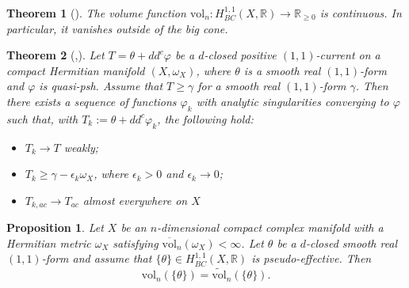 \documentclass[10pt,a4paper]{amsart}
\newtheorem{prop}{Proposition}
\newtheorem{theo}{Theorem}
\newcommand{\RR}{\mathbb{R}}
\begin{document}
\begin{theo}[{\cite[Theorem 3.20]{BGL}}]\label{vanishing-vol}
The volume function $\mathrm{vol}_n:\allowbreak H^{1,1}_{BC}(X,\mathbb{R}) \to \mathbb{R}_{\ge0}$ is continuous. In
particular, it vanishes outside of the big cone.
\end{theo}

\begin{theo}[{\cite[Proposition 3.7]{Dem92},\cite[Theorem 2.4]{Bou}}]\label{regularization}
Let $T=\theta+dd^c\varphi$ be a $d$-closed positive $(1,1)$-current on a compact Hermitian manifold $(X,\omega_X)$, where $\theta$ is a smooth real $(1,1)$-form and $\varphi$ is quasi-psh. Assume that $T\ge\gamma$ for a smooth real $(1,1)$-form $\gamma$. Then there exists a sequence of functions $\varphi_k$ with analytic singularities converging to $\varphi$ such that, with $T_k:=\theta+dd^c\varphi_k$, the following hold:
\begin{itemize}
\item $T_k\to T$ weakly;
\item $T_k\ge\gamma-\epsilon_k\omega_X$, where $\epsilon_k>0$ and $\epsilon_k\to0$;
\item $T_{k,ac}\to T_{ac}$ almost everywhere on $X$
\end{itemize}
\end{theo}

\begin{prop}\label{good}
Let $X$ be an $n$-dimensional compact complex manifold with a Hermitian metric
$\omega_X$ satisfying $\overline{\mathrm{vol}}_n(\omega_X)<\infty$. Let
$\theta$ be a $d$-closed smooth real $(1,1)$-form and assume that $\{\theta\}\in H^{1,1}_{BC}(X,\RR)$ is pseudo-effective. Then
\[
 \mathrm{vol}_n(\{\theta\})=\widetilde{\mathrm{vol}}_n(\{\theta\}).
\]
\end{prop}
\end{document}
